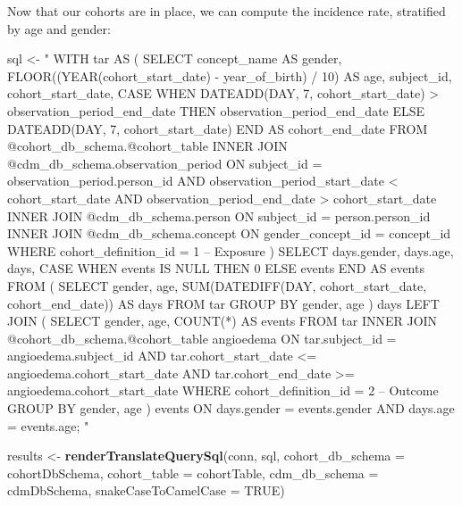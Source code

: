 \documentclass[11pt]{book}
\newenvironment{Shaded}{\begin{snugshade}}{\end{snugshade}}
\newcommand{\KeywordTok}[1]{\textcolor[rgb]{0.13,0.29,0.53}{\textbf{#1}}}
\newcommand{\DataTypeTok}[1]{\textcolor[rgb]{0.13,0.29,0.53}{#1}}
\newcommand{\StringTok}[1]{\textcolor[rgb]{0.31,0.60,0.02}{#1}}
\newcommand{\OtherTok}[1]{\textcolor[rgb]{0.56,0.35,0.01}{#1}}
\newcommand{\NormalTok}[1]{#1}
\begin{document}
Now that our cohorts are in place, we can compute the incidence rate,
stratified by age and gender:

\begin{Shaded}
\begin{Highlighting}[]
\NormalTok{sql <-}\StringTok{ "}
\StringTok{WITH tar AS (}
\StringTok{  SELECT concept_name AS gender,}
\StringTok{    FLOOR((YEAR(cohort_start_date) -}
\StringTok{          year_of_birth) / 10) AS age,}
\StringTok{    subject_id,}
\StringTok{    cohort_start_date,}
\StringTok{    CASE WHEN DATEADD(DAY, 7, cohort_start_date) >}
\StringTok{      observation_period_end_date}
\StringTok{    THEN observation_period_end_date}
\StringTok{    ELSE DATEADD(DAY, 7, cohort_start_date)}
\StringTok{    END AS cohort_end_date}
\StringTok{  FROM @cohort_db_schema.@cohort_table}
\StringTok{  INNER JOIN @cdm_db_schema.observation_period}
\StringTok{    ON subject_id = observation_period.person_id}
\StringTok{      AND observation_period_start_date < cohort_start_date}
\StringTok{      AND observation_period_end_date > cohort_start_date}
\StringTok{  INNER JOIN @cdm_db_schema.person}
\StringTok{    ON subject_id = person.person_id}
\StringTok{  INNER JOIN @cdm_db_schema.concept}
\StringTok{    ON gender_concept_id = concept_id}
\StringTok{  WHERE cohort_definition_id = 1 -- Exposure}
\StringTok{)}
\StringTok{SELECT days.gender,}
\StringTok{    days.age,}
\StringTok{    days,}
\StringTok{    CASE WHEN events IS NULL THEN 0 ELSE events END AS events}
\StringTok{FROM (}
\StringTok{  SELECT gender,}
\StringTok{    age,}
\StringTok{    SUM(DATEDIFF(DAY, cohort_start_date,}
\StringTok{      cohort_end_date)) AS days}
\StringTok{  FROM tar}
\StringTok{  GROUP BY gender,}
\StringTok{    age}
\StringTok{) days}
\StringTok{LEFT JOIN (}
\StringTok{  SELECT gender,}
\StringTok{      age,}
\StringTok{      COUNT(*) AS events}
\StringTok{  FROM tar}
\StringTok{  INNER JOIN @cohort_db_schema.@cohort_table angioedema}
\StringTok{    ON tar.subject_id = angioedema.subject_id}
\StringTok{      AND tar.cohort_start_date <= angioedema.cohort_start_date}
\StringTok{      AND tar.cohort_end_date >= angioedema.cohort_start_date}
\StringTok{  WHERE cohort_definition_id = 2 -- Outcome}
\StringTok{  GROUP BY gender,}
\StringTok{    age}
\StringTok{) events}
\StringTok{ON days.gender = events.gender}
\StringTok{  AND days.age = events.age;}
\StringTok{"}

\NormalTok{results <-}\StringTok{ }\KeywordTok{renderTranslateQuerySql}\NormalTok{(conn, sql,}
                                   \DataTypeTok{cohort_db_schema =}\NormalTok{ cohortDbSchema,}
                                   \DataTypeTok{cohort_table =}\NormalTok{ cohortTable,}
                                   \DataTypeTok{cdm_db_schema =}\NormalTok{ cdmDbSchema,}
                                   \DataTypeTok{snakeCaseToCamelCase =} \OtherTok{TRUE}\NormalTok{)}
\end{Highlighting}
\end{Shaded}
\end{document}
